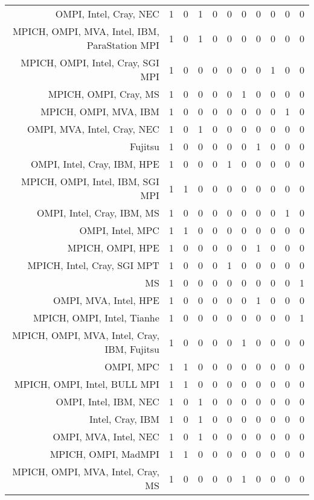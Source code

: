 {\begin{landscape}
\begin{longtable}[htb]{r|c|c|c|c|c|c|c|c|c|c}
{OMPI, Intel, Cray, NEC} & 1 & 0 & 1 & 0 & 0 & 0 & 0 & 0 & 0 & 0 \\%
{MPICH, OMPI, MVA, Intel, IBM, ParaStation MPI} & 1 & 0 & 1 & 0 & 0 & 0 & 0 & 0 & 0 & 0 \\%
{MPICH, OMPI, Intel, Cray, SGI MPI} & 1 & 0 & 0 & 0 & 0 & 0 & 0 & 1 & 0 & 0 \\%
{MPICH, OMPI, Cray, MS} & 1 & 0 & 0 & 0 & 0 & 1 & 0 & 0 & 0 & 0 \\%
{MPICH, OMPI, MVA, IBM} & 1 & 0 & 0 & 0 & 0 & 0 & 0 & 0 & 1 & 0 \\%
{OMPI, MVA, Intel, Cray, NEC} & 1 & 0 & 1 & 0 & 0 & 0 & 0 & 0 & 0 & 0 \\%
{Fujitsu} & 1 & 0 & 0 & 0 & 0 & 0 & 1 & 0 & 0 & 0 \\%
{OMPI, Intel, Cray, IBM, HPE} & 1 & 0 & 0 & 0 & 1 & 0 & 0 & 0 & 0 & 0 \\%
{MPICH, OMPI, Intel, IBM, SGI MPI} & 1 & 1 & 0 & 0 & 0 & 0 & 0 & 0 & 0 & 0 \\%
{OMPI, Intel, Cray, IBM, MS} & 1 & 0 & 0 & 0 & 0 & 0 & 0 & 0 & 1 & 0 \\%
{OMPI, Intel, MPC} & 1 & 1 & 0 & 0 & 0 & 0 & 0 & 0 & 0 & 0 \\%
{MPICH, OMPI, HPE} & 1 & 0 & 0 & 0 & 0 & 0 & 1 & 0 & 0 & 0 \\%
{MPICH, Intel, Cray, SGI MPT} & 1 & 0 & 0 & 0 & 1 & 0 & 0 & 0 & 0 & 0 \\%
{MS} & 1 & 0 & 0 & 0 & 0 & 0 & 0 & 0 & 0 & 1 \\%
{OMPI, MVA, Intel, HPE} & 1 & 0 & 0 & 0 & 0 & 0 & 1 & 0 & 0 & 0 \\%
{MPICH, OMPI, Intel, Tianhe} & 1 & 0 & 0 & 0 & 0 & 0 & 0 & 0 & 0 & 1 \\%
{MPICH, OMPI, MVA, Intel, Cray, IBM, Fujitsu} & 1 & 0 & 0 & 0 & 0 & 1 & 0 & 0 & 0 & 0 \\%
{OMPI, MPC} & 1 & 1 & 0 & 0 & 0 & 0 & 0 & 0 & 0 & 0 \\%
{MPICH, OMPI, Intel, BULL MPI} & 1 & 1 & 0 & 0 & 0 & 0 & 0 & 0 & 0 & 0 \\%
{OMPI, Intel, IBM, NEC} & 1 & 0 & 1 & 0 & 0 & 0 & 0 & 0 & 0 & 0 \\%
{Intel, Cray, IBM} & 1 & 0 & 1 & 0 & 0 & 0 & 0 & 0 & 0 & 0 \\%
{OMPI, MVA, Intel, NEC} & 1 & 0 & 1 & 0 & 0 & 0 & 0 & 0 & 0 & 0 \\%
{MPICH, OMPI, MadMPI} & 1 & 1 & 0 & 0 & 0 & 0 & 0 & 0 & 0 & 0 \\%
{MPICH, OMPI, MVA, Intel, Cray, MS} & 1 & 0 & 0 & 0 & 0 & 1 & 0 & 0 & 0 & 0 \\%

\end{longtable}
\end{landscape}}
